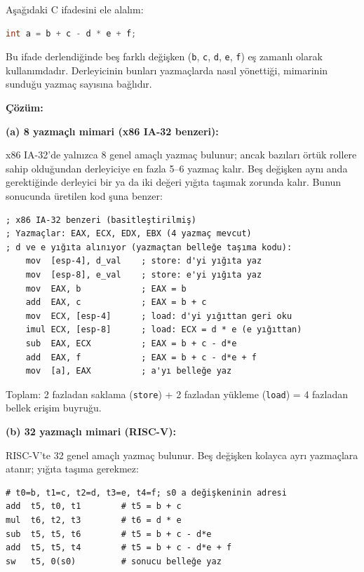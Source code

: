 \begin{ornek}[3.3]
\label{orn:yazmac-tasima}
Aşağıdaki C ifadesini ele alalım:

\begin{lstlisting}[language=C]
int a = b + c - d * e + f;
\end{lstlisting}

Bu ifade derlendiğinde beş farklı değişken (\texttt{b}, \texttt{c}, \texttt{d}, \texttt{e}, \texttt{f}) eş zamanlı olarak kullanımdadır. Derleyicinin bunları yazmaçlarda nasıl yönettiği, mimarinin sunduğu yazmaç sayısına bağlıdır.

\textbf{Çözüm:}

\textbf{(a) 8 yazmaçlı mimari (x86 IA-32 benzeri):}

x86 IA-32'de yalnızca 8 genel amaçlı yazmaç bulunur; ancak bazıları örtük rollere sahip olduğundan derleyiciye en fazla 5--6 yazmaç kalır. Beş değişken aynı anda gerektiğinde derleyici bir ya da iki değeri yığıta taşımak zorunda kalır. Bunun sonucunda üretilen kod şuna benzer:

\begin{lstlisting}[language={}, morecomment={[l]{;}}, texcl=true]
; x86 IA-32 benzeri (basitleştirilmiş)
; Yazmaçlar: EAX, ECX, EDX, EBX (4 yazmaç mevcut)
; d ve e yığıta alınıyor (yazmaçtan belleğe taşıma kodu):
    mov  [esp-4], d_val    ; store: d'yi yığıta yaz
    mov  [esp-8], e_val    ; store: e'yi yığıta yaz
    mov  EAX, b            ; EAX = b
    add  EAX, c            ; EAX = b + c
    mov  ECX, [esp-4]      ; load: d'yi yığıttan geri oku
    imul ECX, [esp-8]      ; load: ECX = d * e (e yığıttan)
    sub  EAX, ECX          ; EAX = b + c - d*e
    add  EAX, f            ; EAX = b + c - d*e + f
    mov  [a], EAX          ; a'yı belleğe yaz
\end{lstlisting}

Toplam: 2 fazladan saklama (\texttt{store}) + 2 fazladan yükleme (\texttt{load}) = 4 fazladan bellek erişim buyruğu.

\textbf{(b) 32 yazmaçlı mimari (RISC-V):}

RISC-V'te 32 genel amaçlı yazmaç bulunur. Beş değişken kolayca ayrı yazmaçlara atanır; yığıta taşıma gerekmez:

\begin{lstlisting}[style=riscv]
# t0=b, t1=c, t2=d, t3=e, t4=f; s0 a değişkeninin adresi
add  t5, t0, t1        # t5 = b + c
mul  t6, t2, t3        # t6 = d * e
sub  t5, t5, t6        # t5 = b + c - d*e
add  t5, t5, t4        # t5 = b + c - d*e + f
sw   t5, 0(s0)         # sonucu belleğe yaz
\end{lstlisting}


\end{ornek}
